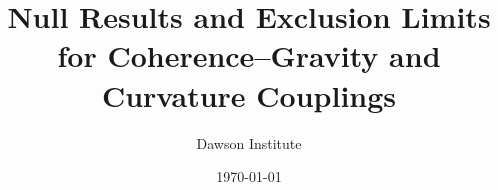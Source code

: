 \documentclass[11pt]{article}
\title{Null Results and Exclusion Limits for Coherence--Gravity and Curvature Couplings}
\author{Dawson Institute}
\date{\today}
\begin{document}
\maketitle

\begin{markdown}

\end{markdown}

%
%
\end{document}
